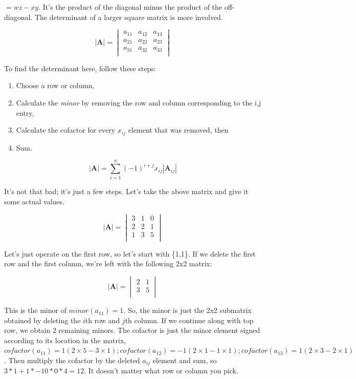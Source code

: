 \documentclass[
]{book}
\begin{document}
\(=wz-xy\). It's the product of the diagonal minus the product of the
off-diagonal. The determinant of a larger square matrix is more
involved.

\[
|\textbf{A}|=\begin{vmatrix}
a_{11}&a_{12}& a_{13}\\
a_{21}&a_{22}& a_{23}\\
a_{31}&a_{32}& a_{33}\\
\end{vmatrix}
\]

To find the determinant here, follow these steps:

\begin{enumerate}
\def\labelenumi{(\arabic{enumi})}
\item
  Choose a row or column,
\item
  Calculate the \emph{minor} by removing the row and column corresponding
  to the i,j entry,
\item
  Calculate the cofactor for every \(x_{ij}\) element that was removed,
  then
\item
  Sum.
\end{enumerate}

\[|\textbf{A}|=\sum_{i=1}^n (-1)^{i+j} x_{ij} |\textbf{A}_{ij}|\]

It's not that bad; it's just a few steps. Let's take the above matrix
and give it some actual values.

\[
|\textbf{A}|=\begin{vmatrix}
3&1&0\\
2&2&1\\
1&3&5\\
\end{vmatrix}
\]

Let's just operate on the first row, so let's start with \{1,1\}. If we
delete the first row and the first column, we're left with the following
2x2 matrix:

\[
|\textbf{A}|=\begin{vmatrix}
2&1\\
3&5\\
\end{vmatrix}
\]

This is the minor of \(minor(a_{11})=1\). So, the minor is just the 2x2
submatrix obtained by deleting the \(i\)th row and \(j\)th column. If we
continue along with top row, we obtain 2 remaining minors. The
cofactor is just the minor element signed according to its
location in the matrix,
\(cofactor(a_{11})=1(2\times 5-3\times 1) ; cofactor(a_{12})=-1(2\times 1-1\times 1); cofactor(a_{13})=1(2\times 3-2\times 1)\).
Then multiply the cofactor by the deleted \(a_{ij}\) element and sum, so
\(3*1+1*-10*0*4=12\). It doesn't matter what row or column you pick.
\end{document}
